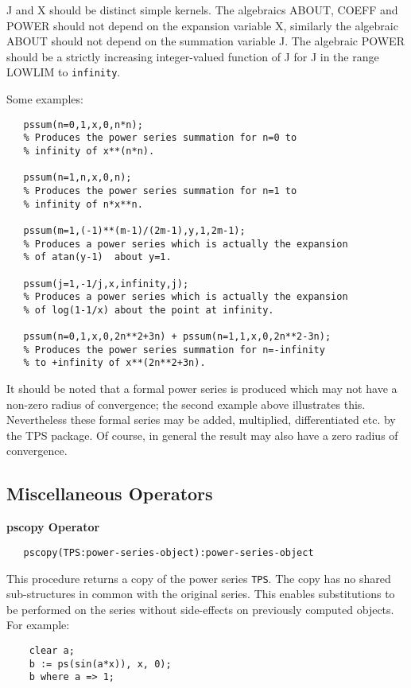J and X should be distinct simple kernels. The algebraics
ABOUT,  COEFF and POWER should not depend on the
expansion variable X, similarly the algebraic ABOUT should
not depend on the summation variable J.  The algebraic POWER should be
a strictly increasing integer-valued function of J for J in the range
LOWLIM to \texttt{infinity}.

Some examples:
\begin{verbatim}
   pssum(n=0,1,x,0,n*n);
   % Produces the power series summation for n=0 to
   % infinity of x**(n*n).

   pssum(n=1,n,x,0,n);
   % Produces the power series summation for n=1 to
   % infinity of n*x**n.

   pssum(m=1,(-1)**(m-1)/(2m-1),y,1,2m-1);
   % Produces a power series which is actually the expansion
   % of atan(y-1)  about y=1.

   pssum(j=1,-1/j,x,infinity,j);
   % Produces a power series which is actually the expansion
   % of log(1-1/x) about the point at infinity.

   pssum(n=0,1,x,0,2n**2+3n) + pssum(n=1,1,x,0,2n**2-3n);
   % Produces the power series summation for n=-infinity
   % to +infinity of x**(2n**2+3n).
\end{verbatim}
It should be noted that a formal power series is produced which may not have
a non-zero radius of convergence; the second example above illustrates this.
Nevertheless these formal series may be added, multiplied, differentiated etc.
by the TPS package. Of course, in general the result may also have a zero radius
of convergence.

\subsection{Miscellaneous Operators}

\textbf{pscopy Operator}
\hypertarget{operator:PSCOPY}{}
\begin{verbatim}
   pscopy(TPS:power-series-object):power-series-object
\end{verbatim}
This procedure returns a copy of the power series \texttt{TPS}. 
The copy has no shared sub-structures in common with the original
 series.  This enables substitutions to be performed on the series
 without side-effects on previously computed objects. For example:
\begin{verbatim}
    clear a;
    b := ps(sin(a*x)), x, 0);
    b where a => 1;
\end{verbatim}

